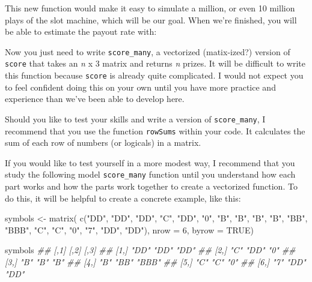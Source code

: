 \documentclass[
  letterpaper,
  DIV=11,
  numbers=noendperiod]{scrbook}
\newenvironment{Shaded}{\begin{snugshade}}{\end{snugshade}}
\newcommand{\AttributeTok}[1]{\textcolor[rgb]{0.40,0.45,0.13}{#1}}
\newcommand{\CommentTok}[1]{\textcolor[rgb]{0.37,0.37,0.37}{#1}}
\newcommand{\ConstantTok}[1]{\textcolor[rgb]{0.56,0.35,0.01}{#1}}
\newcommand{\DecValTok}[1]{\textcolor[rgb]{0.68,0.00,0.00}{#1}}
\newcommand{\DocumentationTok}[1]{\textcolor[rgb]{0.37,0.37,0.37}{\textit{#1}}}
\newcommand{\FunctionTok}[1]{\textcolor[rgb]{0.28,0.35,0.67}{#1}}
\newcommand{\NormalTok}[1]{\textcolor[rgb]{0.00,0.23,0.31}{#1}}
\newcommand{\OtherTok}[1]{\textcolor[rgb]{0.00,0.23,0.31}{#1}}
\newcommand{\StringTok}[1]{\textcolor[rgb]{0.13,0.47,0.30}{#1}}
\begin{document}
This new function would make it easy to simulate a million, or even 10
million plays of the slot machine, which will be our goal. When we're
finished, you will be able to estimate the payout rate with:

\begin{Shaded}
\end{Shaded}

Now you just need to write \texttt{score\_many}, a vectorized
(matix-ized?) version of \texttt{score} that takes an \emph{n} x 3
matrix and returns \emph{n} prizes. It will be difficult to write this
function because \texttt{score} is already quite complicated. I would
not expect you to feel confident doing this on your own until you have
more practice and experience than we've been able to develop here.

Should you like to test your skills and write a version of
\texttt{score\_many}, I recommend that you use the function
\texttt{rowSums} within your code. It calculates the sum of each row of
numbers (or logicals) in a matrix.

If you would like to test yourself in a more modest way, I recommend
that you study the following model \texttt{score\_many} function until
you understand how each part works and how the parts work together to
create a vectorized function. To do this, it will be helpful to create a
concrete example, like this:

\begin{Shaded}
\begin{Highlighting}[]
\NormalTok{symbols }\OtherTok{\textless{}{-}} \FunctionTok{matrix}\NormalTok{(}
  \FunctionTok{c}\NormalTok{(}\StringTok{"DD"}\NormalTok{, }\StringTok{"DD"}\NormalTok{, }\StringTok{"DD"}\NormalTok{, }
    \StringTok{"C"}\NormalTok{, }\StringTok{"DD"}\NormalTok{, }\StringTok{"0"}\NormalTok{, }
    \StringTok{"B"}\NormalTok{, }\StringTok{"B"}\NormalTok{, }\StringTok{"B"}\NormalTok{, }
    \StringTok{"B"}\NormalTok{, }\StringTok{"BB"}\NormalTok{, }\StringTok{"BBB"}\NormalTok{, }
    \StringTok{"C"}\NormalTok{, }\StringTok{"C"}\NormalTok{, }\StringTok{"0"}\NormalTok{, }
    \StringTok{"7"}\NormalTok{, }\StringTok{"DD"}\NormalTok{, }\StringTok{"DD"}\NormalTok{), }\AttributeTok{nrow =} \DecValTok{6}\NormalTok{, }\AttributeTok{byrow =} \ConstantTok{TRUE}\NormalTok{)}

\NormalTok{symbols}
\DocumentationTok{\#\#      [,1] [,2] [,3] }
\DocumentationTok{\#\# [1,] "DD" "DD" "DD" }
\DocumentationTok{\#\# [2,] "C"  "DD" "0"  }
\DocumentationTok{\#\# [3,] "B"  "B"  "B"  }
\DocumentationTok{\#\# [4,] "B"  "BB" "BBB"}
\DocumentationTok{\#\# [5,] "C"  "C"  "0"  }
\DocumentationTok{\#\# [6,] "7"  "DD" "DD" }
\end{Highlighting}
\end{Shaded}
\end{document}
